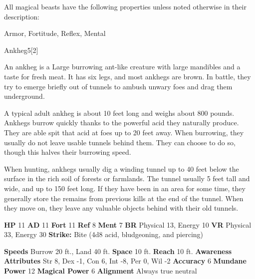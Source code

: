         All magical beasts have the following properties unless noted otherwise in their description:
        
    
     Armor,
     Fortitude,
     Reflex,
     Mental
  
  
      
  \begin{monsection}{Ankheg}{5}[2]
    \vspace{-1em}\vspace{-1em}
    \vspace{0em}

    
        An ankheg is a Large burrowing ant-like creature with large mandibles and a taste for fresh meat.
        It has six legs, and most ankhegs are brown.
        In battle, they try to emerge briefly out of tunnels to ambush unwary foes and drag them underground.
      
        A typical adult ankheg is about 10 feet long and weighs about 800 pounds.
        Ankhegs burrow quickly thanks to the powerful acid they naturally produce.
        They are able spit that acid at foes up to 20 feet away.
        When burrowing, they usually do not leave usable tunnels behind them.
        They can choose to do so, though this halves their burrowing speed.
      
        When hunting, ankhegs usually dig a winding tunnel up to 40 feet below the surface in the rich soil of forests or farmlands.
        The tunnel usually 5 feet tall and wide, and up to 150 feet long.
        If they have been in an area for some time, they generally store the remains from previous kills at the end of the tunnel.
        When they move on, they leave any valuable objects behind with their old tunnels.
      

    \begin{spellcontent}
      \begin{spelltargetinginfo}
        \pari \textbf{HP} 11 \monsep
          \textbf{AD} 11 \monsep
          \textbf{Fort} 11 \monsep
          \textbf{Ref} 8 \monsep
          \textbf{Ment} 7
        \pari \textbf{BR} Physical 13, Energy 10 \monsep
        \textbf{VR} Physical 33, Energy 30
        \pari \textbf{Strike:}
            Bite  (4d8 acid, bludgeoning, and piercing)
      \end{spelltargetinginfo}
    \end{spellcontent}
    \begin{monsterfooter}
      \pari \textbf{Speeds} Burrow 20 ft., Land 40 ft. \monsep
        \textbf{Space} 10 ft. \monsep
        \textbf{Reach} 10 ft.
      \pari \textbf{Awareness} 
      \pari \textbf{Attributes}
        Str 8, Dex -1,
        Con 6, Int -8,
        Per 0, Wil -2
      \pari \textbf{Accuracy} 6 \monsep
        \textbf{Mundane Power} 12 \monsep
      \textbf{Magical Power} 6
      \pari \textbf{Alignment} Always true neutral
    \end{monsterfooter}
  \end{monsection}
